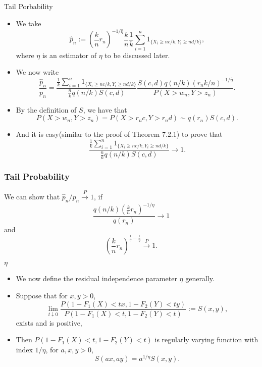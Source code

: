 \documentclass[11pt]{beamer}
\newcommand{\suit}[1]{\left(#1\right)}
\begin{document}
\begin{frame}{Tail Porbability}
\begin{itemize}
\item We take
\begin{displaymath}
\hat{p}_n:=(\frac{k}{n}r_n)^{-1/\hat{\eta}}\frac{k}{n}\frac{1}{k}\sum_{i=1}^n 1_{\{ X_i\ge nc/k, Y_i\ge nd/k\}}, 
\end{displaymath}
where $\eta$ is an estimator of $\eta$ to be discussed later.
\item We now write 
$$
\frac{\hat{p}_n}{p_n}=\frac{\frac{1}{k}\sum_{i=1}^n 1_{\{ X_i\ge nc/k, Y_i\ge nd/k\}}}{\frac{n}{k}q(n/k)S(c,d)} \frac{S(c,d)q(n/k)\suit{r_nk/n}^{-1/\hat{\eta}}}{P(X>w_n, Y>z_n)}.
$$
\item By the definition of $S$, we have that 
$$
P(X>w_n, Y>z_n) =P(X>r_n c, Y>r_n d)\sim q(r_n)S(c,d).
$$
\item  And it is easy(similar to the  proof of Theorem 7.2.1) to prove that 
$$
\frac{\frac{1}{k}\sum_{i=1}^n 1_{\{ X_i\ge nc/k, Y_i\ge nd/k\}}}{\frac{n}{k}q(n/k)S(c,d)}  \to 1.
$$
\end{itemize}
\end{frame}


\begin{frame}
	\frametitle{Tail Probability}
We can show that $\hat{p}_n/p_n \stackrel{P}{\to} 1$, if 
$$
\frac{q(n/k)\suit{\frac{k}{n}r_n}^{-1/\eta}}{q(r_n)}\to 1
$$
and 
$$
\suit{\frac{k}{n}r_n}^{\frac{1}{\eta}-\frac{1}{\hat{\eta}}}\stackrel{P}{\to} 1.
$$
	

\end{frame}
\begin{frame}{ $\eta$}
\begin{itemize}
\item We now define the residual independence parameter $\eta$ generally.
\item Suppose that for $x,y>0$,
\begin{equation}
\lim_{t\downarrow 0} \dfrac{P(1-F_1(X)<tx, 1-F_2(Y)<ty)}{P(1-F_1(X)<t, 1-F_2(Y)<t)}:=S(x,y), \tag{7.6.1}
\end{equation}
exists and is positive,
\item Then $P(1-F_1(X)<t, 1-F_2(Y)<t)$ is regularly varying function with index $1/\eta$, for $a,x,y>0$,
\begin{displaymath}
S(ax,ay)=a^{1/\eta}S(x,y).
\end{displaymath}
\end{itemize}
\end{frame}
\end{document}
